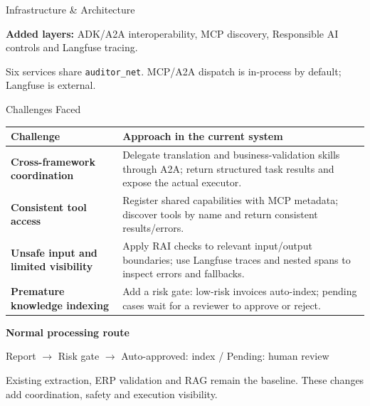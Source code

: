 \documentclass[aspectratio=169]{beamer}
\begin{document}
\begin{frame}{Infrastructure \& Architecture}
{}

  \vspace{3mm}
  {\small\textbf{Added layers:} ADK/A2A interoperability, MCP discovery,
  Responsible AI controls and Langfuse tracing.}\par
  \vspace{1mm}
  {\footnotesize Six services share \texttt{auditor\_net}.
  MCP/A2A dispatch is in-process by default; Langfuse is external.}
\end{frame}

\begin{frame}{Challenges Faced}
  \small
  \renewcommand{\arraystretch}{1.38}
  \setlength{\tabcolsep}{5pt}
  \begin{tabular}{@{}p{3.3cm}p{10.1cm}@{}}
    \textbf{\color{brandblue}Challenge} &
    \textbf{\color{brandblue}Approach in the current system} \\ \hline
    \textbf{Cross-framework coordination} &
    Delegate translation and business-validation skills through A2A;
    return structured task results and expose the actual executor. \\
    \textbf{Consistent tool access} &
    Register shared capabilities with MCP metadata;
    discover tools by name and return consistent results/errors. \\
    \textbf{Unsafe input and limited visibility} &
    Apply RAI checks to relevant input/output boundaries;
    use Langfuse traces and nested spans to inspect errors and fallbacks. \\
    \textbf{Premature knowledge indexing} &
    Add a risk gate: low-risk invoices auto-index;
    pending cases wait for a reviewer to approve or reject. \\ \hline
  \end{tabular}

  \vspace{4mm}
  {\color{brandblue}\textbf{Normal processing route}}\par
  \vspace{1mm}
  Report $\to$ Risk gate $\to$
  \textcolor{good}{Auto-approved: index}
  \quad / \quad
  \textcolor{warn}{Pending: human review}

  \vspace{3mm}
  {\footnotesize Existing extraction, ERP validation and RAG remain the baseline.
  These changes add coordination, safety and execution visibility.}
\end{frame}
\end{document}

